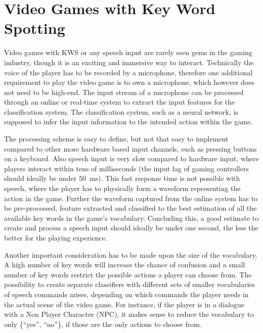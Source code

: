 
\section{Video Games with Key Word Spotting}\label{sec:intro_games}
Video games with KWS or any speech input are rarely seen gems in the gaming industry, though it is an exciting and immersive way to interact.
Technically the voice of the player has to be recorded by a microphone, therefore one additional requirement to play the video game is to own a microphone, which however does not need to be high-end.
The input stream of a microphone can be processed through an online or real-time system to extract the input features for the classification system.
The classification system, such as a neural network, is supposed to infer the input information to the intended action within the game.

The processing scheme is easy to define, but not that easy to implement compared to other more hardware based input channels, such as pressing buttons on a keyboard.
Also speech input is very slow compared to hardware input, where players interact within tens of milliseconds (the input lag of gaming controllers should ideally be under \SI{50}{\milli\second}).
This fast response time is not possible with speech, where the player has to physically form a waveform representing the action in the game.
Further the waveform captured from the online system has to be pre-processed, feature extracted and classified to the best estimation of all the available key words in the game's vocabulary.
Concluding this, a good estimate to create and process a speech input should ideally be under one second, the less the better for the playing experience.

Another important consideration has to be made upon the size of the vocabulary.
A high number of key words will increase the chance of confusion and a small number of key words restrict the possible actions a player can choose from.
The possibility to create separate classifiers with different sets of smaller vocabularies of speech commands arises, depending on which commands the player needs in the actual scene of the video game.
For instance, if the player is in a dialogue with a Non Player Character (NPC), it makes sense to reduce the vocabulary to only \{\enquote{yes}, \enquote{no}\}, if those are the only actions to choose from.

